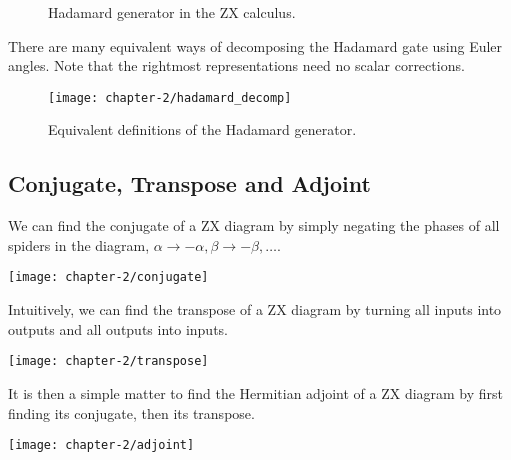 \begin{figure}[H]
    \caption{Hadamard generator in the ZX calculus.}
\end{figure}

There are many equivalent ways of decomposing the Hadamard gate using Euler angles. Note that the rightmost representations need no scalar corrections.
\begin{figure}[H]
\centering
    \centering
    \texttt{[image: chapter-2/hadamard\_decomp]}
    \caption{Equivalent definitions of the Hadamard generator.}
\end{figure}

\subsection{Conjugate, Transpose and Adjoint}

We can find the conjugate of a ZX diagram by simply negating the phases of all spiders in the diagram, $\alpha \rightarrow -\alpha, \beta \rightarrow -\beta, \dots$.

\begin{center}
    \texttt{[image: chapter-2/conjugate]}
\end{center}

Intuitively, we can find the transpose of a ZX diagram by turning all inputs into outputs and all outputs into inputs.

\begin{center}
    \texttt{[image: chapter-2/transpose]}
\end{center}

It is then a simple matter to find the Hermitian adjoint of a ZX diagram by first finding its conjugate, then its transpose.

\begin{center}
    \texttt{[image: chapter-2/adjoint]}
\end{center}

